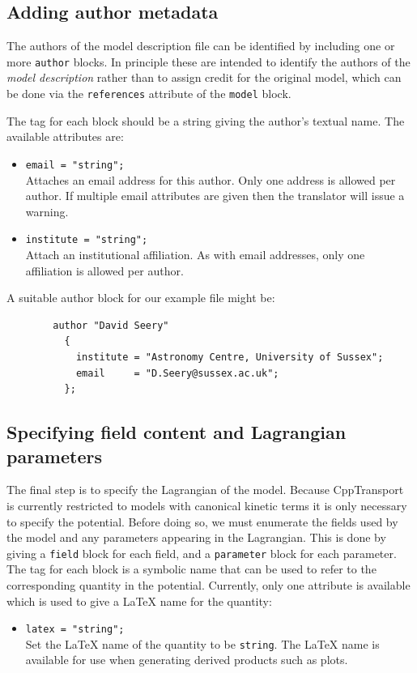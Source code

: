 \documentclass[11pt,a4paper]{article}
\newenvironment{example}{\begin{tcolorbox}[enhanced,breakable,colback=black!10,colbacktitle=black!20,colframe=black!40,coltitle=black,title=Example,fonttitle=\sffamily\fontseries{b}\selectfont]}{\end{tcolorbox}}
\newcommand{\packagefont}{\sffamily}
\newcommand{\CppTransport}{{\packagefont CppTransport}}
\newcommand{\block}[1]{\texttt{#1}}
\newcommand{\attribute}[1]{\texttt{#1}}
\begin{document}
\subsection{Adding author metadata}
\label{sec:author-block}
The authors of the model description file can be
identified by including one or more \block{author}
blocks.
In principle these are intended to identify the authors
of the \emph{model description} rather than to assign
credit for the original model,
which can be done via the
\attribute{references} attribute
of the \block{model} block.

The tag for each block should be a string giving the
author's textual name.
The available attributes are:
\begin{itemize}
    \item \attribute{email = "string";} \\
    Attaches an email address for this author. Only one
    address is allowed per author.
    If multiple email attributes are given then the
    translator will issue a warning.
    
    \item \attribute{institute = "string";} \\
    Attach an institutional affiliation.
    As with email addresses, only one affiliation
    is allowed per author.
\end{itemize}

\begin{example}
    A suitable author block for our example file might be:
    \begin{verbatim}
        author "David Seery"
          {
            institute = "Astronomy Centre, University of Sussex";
            email     = "D.Seery@sussex.ac.uk";
          };    
    \end{verbatim}
\end{example}

\subsection{Specifying field content and Lagrangian parameters}
\label{sec:field-param-block}
The final step is to specify the Lagrangian of the model.
Because {\CppTransport} is currently restricted to models with
canonical kinetic terms it is only necessary to specify the potential.
Before doing so, we must enumerate the fields used by the model
and any parameters appearing in the Lagrangian.
This is done by giving
a \block{field} block for each field, and a \block{parameter} block
for each parameter.
The tag for each block is a symbolic name that can be used to refer
to the corresponding quantity in the potential.
Currently, only one attribute is available which is used to give
a {\LaTeX} name for the quantity:
\begin{itemize}
    \item \attribute{latex = "string";} \\
    Set the {\LaTeX} name of the quantity to be
    \attribute{string}.
    The {\LaTeX} name is available for use when generating derived
    products such as plots.    
\end{itemize}
\end{document}
